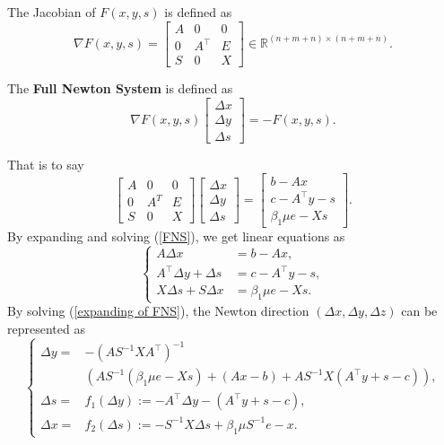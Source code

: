The Jacobian of $F(x,y,s)$ is defined as 
$$
\nabla F(x, y, s)=\left[\begin{array}{ccc}
A & 0 & 0 \\
0 & A^{\top} & E \\
S & 0 & X
\end{array}\right] \in \mathbb{R}^{(n+m+n) \times (n+m+n)}.
$$
\begin{definition}
The \textbf{Full Newton System} is defined as
$$
\nabla F(x, y, s)\left[\begin{array}{l}
\Delta x \\
\Delta y \\
\Delta s
\end{array}\right]=-F(x, y, s) .
$$
\end{definition}
That is to say
\begin{equation}\label{FNS}
\left[\begin{array}{ccc}
A & 0 & 0 \\
0 & A^T & E \\
S & 0 & X
\end{array}\right]\left[\begin{array}{c}
\Delta x \\
\Delta y \\
\Delta s
\end{array}\right]=\left[\begin{array}{l}
b-A x \\
c-A^{\top} y-s \\
\beta_1 \mu e-Xs
\end{array}\right].
\end{equation}
By expanding and solving (\ref{FNS}), we get linear equations as
\begin{equation}\label{expanding of FNS}
\left\{
\begin{aligned}
A \Delta x & =b-A x, \\
A^{\top} \Delta y+\Delta s & =c-A^{\top} y-s, \\
X \Delta s+S \Delta x & =\beta_1 \mu e-X s .
\end{aligned}
\right.
\end{equation}
By solving (\ref{expanding of FNS}), the Newton direction $(\Delta x, \Delta y, \Delta z)$ can be represented as 
\begin{equation}\label{solution of FNS}
\left\{
\begin{aligned}
\Delta y= 
& -\left(A S^{-1} X A^{\top}\right)^{-1} \\
& \left(A S^{-1}\left(\beta_1\mu e-X s\right)+\left(A x-b\right)+A S^{-1} X\left(A^{\top} y+s-c\right)\right), \\
\Delta s = &f_1(\Delta y) := -A^{\top} \Delta y-\left(A^{\top} y+s-c\right), \\
\Delta x = &f_2(\Delta s) := -S^{-1} X \Delta s+\beta_1\mu S^{-1} e-x.
\end{aligned}
\right.
\end{equation}
